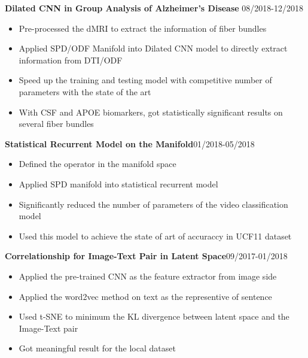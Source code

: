 \documentclass[margin]{res}
\begin{document}
\begin{resume}
                \textbf{Dilated CNN in Group Analysis of Alzheimer's Disease} \hfill 08/2018-12/2018
                \begin{itemize}\itemsep -2.2pt %
                 \item Pre-processed the dMRI to extract the information of fiber bundles
                 \item Applied SPD/ODF Manifold into Dilated CNN model to directly extract information from DTI/ODF
                 \item Speed up the training and testing model with competitive number of parameters with the state of the art 
                 \item With CSF and APOE biomarkers, got statistically signiﬁcant results on several fiber bundles
                 \end{itemize}

                 \textbf{Statistical Recurrent Model on the Manifold}\hfill 01/2018-05/2018
                \begin{itemize}\itemsep -2.2pt %
                 \item Defined the operator in the manifold space
                 \item Applied SPD manifold into statistical recurrent model
                 \item Significantly reduced the number of parameters of the video classification model
                 \item Used this model to achieve the state of art of accuraccy in UCF11 dataset
                 \end{itemize}

                 \textbf{Correlationship for Image-Text Pair in Latent Space}\hfill 09/2017-01/2018
                \begin{itemize}\itemsep -2.2pt %
                 \item Applied the pre-trained CNN as the feature extractor from image side 
                 \item Applied the word2vec method on text as the representive of sentence
                 \item Used t-SNE to minimum the KL divergence between latent space and the Image-Text pair
                 \item Got meaningful result for the local dataset
                 \end{itemize}


\end{resume}
\end{document}
